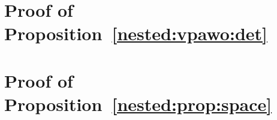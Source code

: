 \section{Proof of Proposition~\ref{nested:vpawo:det}}


\section{Proof of Proposition~\ref{nested:prop:space}}
